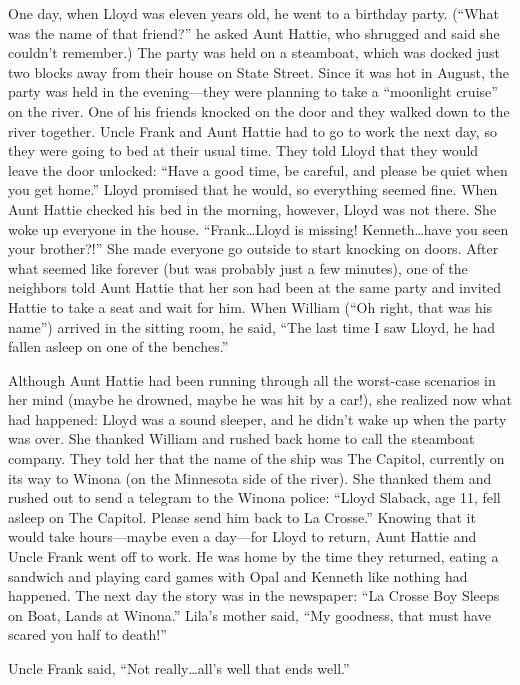 \documentclass[
  american,
  letterpaper,
]{book}
\begin{document}
One day, when Lloyd was eleven years old, he went to a birthday party.
(``What was the name of that friend?'' he asked Aunt Hattie, who
shrugged and said she couldn't remember.) The party was held on a
steamboat, which was docked just two blocks away from their house on
State Street. Since it was hot in August, the party was held in the
evening---they were planning to take a ``moonlight cruise'' on the
river. One of his friends knocked on the door and they walked down to
the river together. Uncle Frank and Aunt Hattie had to go to work the
next day, so they were going to bed at their usual time. They told Lloyd
that they would leave the door unlocked: ``Have a good time, be careful,
and please be quiet when you get home.'' Lloyd promised that he would,
so everything seemed fine. When Aunt Hattie checked his bed in the
morning, however, Lloyd was not there. She woke up everyone in the
house. ``Frank\ldots Lloyd is missing! Kenneth\ldots have you seen your
brother?!'' She made everyone go outside to start knocking on doors.
After what seemed like forever (but was probably just a few minutes),
one of the neighbors told Aunt Hattie that her son had been at the same
party and invited Hattie to take a seat and wait for him. When William
(``Oh right, that was his name'') arrived in the sitting room, he said,
``The last time I saw Lloyd, he had fallen asleep on one of the
benches.''

Although Aunt Hattie had been running through all the worst-case
scenarios in her mind (maybe he drowned, maybe he was hit by a car!),
she realized now what had happened: Lloyd was a sound sleeper, and he
didn't wake up when the party was over. She thanked William and rushed
back home to call the steamboat company. They told her that the name of
the ship was The Capitol, currently on its way to Winona (on the
Minnesota side of the river). She thanked them and rushed out to send a
telegram to the Winona police: ``Lloyd Slaback, age 11, fell asleep on
The Capitol. Please send him back to La Crosse.'' Knowing that it would
take hours---maybe even a day---for Lloyd to return, Aunt Hattie and
Uncle Frank went off to work. He was home by the time they returned,
eating a sandwich and playing card games with Opal and Kenneth like
nothing had happened. The next day the story was in the newspaper: ``La
Crosse Boy Sleeps on Boat, Lands at Winona.'' Lila's mother said, ``My
goodness, that must have scared you half to death!''

Uncle Frank said, ``Not really\ldots all's well that ends well.''
\end{document}
